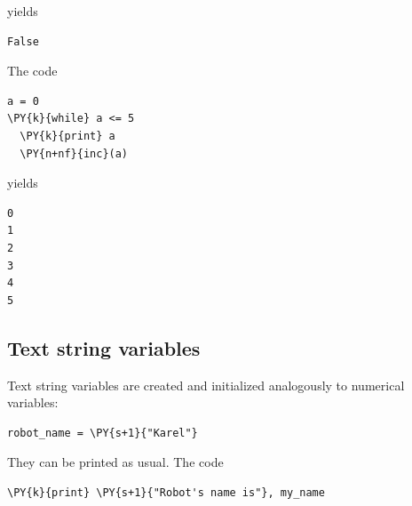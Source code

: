 \noindent
yields\\

\begin{ybox}
\begin{Verbatim}[commandchars=\\\{\}]
False
\end{Verbatim}
\end{ybox}
\vspace{6mm}

\noindent
The code \\

\begin{bbox}
\begin{Verbatim}[commandchars=\\\{\}]
a = 0
\PY{k}{while} a <= 5
  \PY{k}{print} a 
  \PY{n+nf}{inc}(a)
\end{Verbatim}
\end{bbox}
\vspace{6mm}

\noindent
yields\\

\begin{ybox}
\begin{Verbatim}[commandchars=\\\{\}]
0
1
2
3
4
5
\end{Verbatim}
\end{ybox}
\vspace{6mm}

\noindent

\subsection[\ \ Text string variables]{Text string variables}

Text string variables are created and initialized analogously 
to numerical variables:\\

\begin{bbox}
\begin{Verbatim}[commandchars=\\\{\}]
robot_name = \PY{s+1}{"Karel"}
\end{Verbatim}
\end{bbox}
\vspace{6mm}
 
\noindent
They can be printed as usual. The code\\

\begin{bbox}
\begin{Verbatim}[commandchars=\\\{\}]
\PY{k}{print} \PY{s+1}{"Robot's name is"}, my_name
\end{Verbatim}
\end{bbox}
\vspace{6mm}

